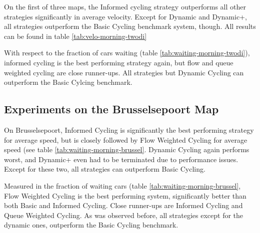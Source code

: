 \documentclass[11pt]{article}
\begin{document}
On the first of three maps, the Informed cycling strategy outperforms all other strategies significantly in average velocity. Except for Dynamic and Dynamic+, all strategies outperform the Basic Cycling benchmark system, though. All results can be found in table \ref{tab:velo-morning-twodi}

With respect to the fraction of cars waiting (table \ref{tab:waiting-morning-twodi}), informed cycling is the best performing strategy again, but flow and queue weighted cycling are close runner-ups. All strategies but Dynamic Cycling can outperform the Basic Cylcing benchmark.

\subsection{Experiments on the Brusselsepoort Map}
On Brusselsepoort, Informed Cycling is significantly the best performing strategy for average speed, but is closely followed by Flow Weighted Cycling for average speed (see table \ref{tab:waiting-morning-brussel}. Dynamic Cycling again performs worst, and Dynamic+ even had to be terminated due to performance issues. Except for these two, all strategies can outperform Basic Cycling.

Measured in the fraction of waiting cars (table \ref{tab:waiting-morning-brussel}, Flow Weighted Cycling is the best performing system, significantly better than both Basic and Informed Cycling. Close runner-ups are Informed Cycling and Queue Weighted Cycling. As was observed before, all strategies except for the dynamic ones, outperform the Basic Cycling benchmark.
\end{document}
